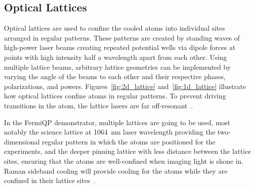 \subsection*{Optical Lattices}\label{ch:optical_lattices}
Optical lattices are used to confine the cooled atoms into individual sites arranged in regular patterns. These patterns are created by standing waves of high-power laser beams creating repeated potential wells via dipole forces at points with high intensity  half a wavelength apart from each other. Using multiple lattice beams, arbitrary lattice geometries can be implemented by varying the angle of the beams to each other and their respective phases, polarizations, and powers. Figures~\ref{fig:2d_lattice} and~\ref{fig:1d_lattice} illustrate how optical lattices confine atoms in regular patterns. To prevent driving transitions in the atom, the lattice lasers are far off-resonant~\cite{bloch_many-body_2008, bloch_quantum_2012}.

In the FermiQP demonstrator, multiple lattices are going to be used, most notably the science lattice at \SI[]{1064}{\nano\meter} laser wavelength providing the two-dimensional regular pattern in which the atoms are positioned for the experiments, and the deeper pinning lattice with less distance between the lattice sites, ensuring that the atoms are well-confined when imaging light is shone in. Raman sideband cooling will provide cooling for the atoms while they are confined in their lattice sites~\cite{hilker_spin-resolved_2017, krumm_notitle_2022}.

